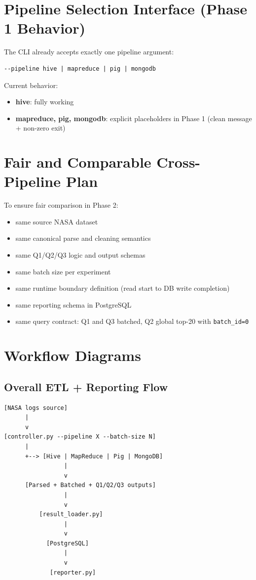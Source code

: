\documentclass[12pt,a4paper]{article}
\begin{document}
\section{Pipeline Selection Interface (Phase 1 Behavior)}
The CLI already accepts exactly one pipeline argument:
\begin{lstlisting}
--pipeline hive | mapreduce | pig | mongodb
\end{lstlisting}
Current behavior:
\begin{itemize}
    \item \textbf{hive}: fully working
    \item \textbf{mapreduce, pig, mongodb}: explicit placeholders in Phase 1 (clean message + non-zero exit)
\end{itemize}

\section{Fair and Comparable Cross-Pipeline Plan}
To ensure fair comparison in Phase 2:
\begin{itemize}
    \item same source NASA dataset
    \item same canonical parse and cleaning semantics
    \item same Q1/Q2/Q3 logic and output schemas
    \item same batch size per experiment
    \item same runtime boundary definition (read start to DB write completion)
    \item same reporting schema in PostgreSQL
    \item same query contract: Q1 and Q3 batched, Q2 global top-20 with \texttt{batch\_id=0}
\end{itemize}

\section{Workflow Diagrams}
\subsection{Overall ETL + Reporting Flow}
\begin{verbatim}
[NASA logs source]
      |
      v
[controller.py --pipeline X --batch-size N]
      |
      +--> [Hive | MapReduce | Pig | MongoDB]
                 |
                 v
      [Parsed + Batched + Q1/Q2/Q3 outputs]
                 |
                 v
          [result_loader.py]
                 |
                 v
            [PostgreSQL]
                 |
                 v
             [reporter.py]
\end{verbatim}
\end{document}
